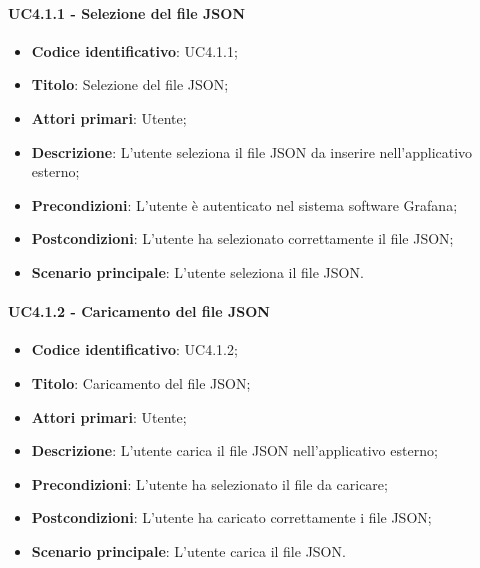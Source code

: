 \paragraph{UC4.1.1 - Selezione del file JSON}
\begin{itemize}
	\item \textbf{Codice identificativo}: UC4.1.1;
	\item \textbf{Titolo}: Selezione del file JSON;
	\item \textbf{Attori primari}: Utente;
	\item \textbf{Descrizione}: L'utente seleziona il file JSON da inserire nell'applicativo esterno;
	\item \textbf{Precondizioni}: L'utente è autenticato nel sistema software Grafana\glo;
	\item \textbf{Postcondizioni}: L'utente ha selezionato correttamente il file JSON;
	\item \textbf{Scenario principale}: L'utente seleziona il file JSON.
\end{itemize}

\paragraph{UC4.1.2 - Caricamento del file JSON}
\begin{itemize}
	\item \textbf{Codice identificativo}: UC4.1.2;
	\item \textbf{Titolo}: Caricamento del file JSON;
	\item \textbf{Attori primari}: Utente;
	\item \textbf{Descrizione}: L'utente carica il file JSON nell'applicativo esterno;
	\item \textbf{Precondizioni}: L'utente ha selezionato il file da caricare;
	\item \textbf{Postcondizioni}: L'utente ha caricato correttamente i file JSON;
	\item \textbf{Scenario principale}: L'utente carica il file JSON.
\end{itemize}

